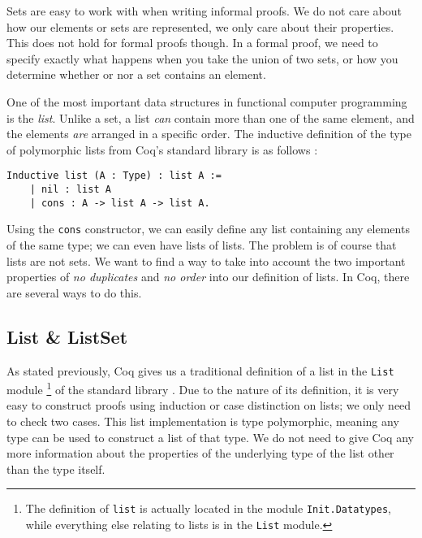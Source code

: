 Sets are easy to work with when writing informal proofs.
We do not care about how our elements or sets are represented, we only care about their properties.
This does not hold for formal proofs though. In a formal proof, we need to specify exactly what happens
when you take the union of two sets, or how you determine whether or nor a set contains an element.

One of the most important data structures in functional computer programming is the \emph{list}.
Unlike a set, a list \emph{can} contain more than one of the same element, and the elements \emph{are} arranged in a
specific order.
The inductive definition of the type of polymorphic lists from Coq's standard library is as follows \cite{coqdatatypes}:

\begin{minipage}{\linewidth}
\begin{lstlisting}[language=Coq, label={lst:list_def}, caption={Inductive definition of the list type in Coq}]
Inductive list (A : Type) : list A :=
    | nil : list A
    | cons : A -> list A -> list A.
\end{lstlisting}
\end{minipage}

Using the \lstinline{cons} constructor, we can easily define any list containing any elements of the same type;
we can even have lists of lists.
The problem is of course that lists are not sets. We want to find a way to take into account the two important properties
of \emph{no duplicates} and \emph{no order} into our definition of lists.
In Coq, there are several ways to do this.

\subsection{List \& ListSet}
\label{ssec:list_listset}

As stated previously, Coq gives us a traditional definition of a list in the \lstinline{List} module
\footnote{The definition of \lstinline{list} is actually located in the module \lstinline{Init.Datatypes},
while everything else relating to lists is in the \lstinline{List} module.} of the standard library \cite{coqlist}.
Due to the nature of its definition, it is very easy to construct proofs using induction or case distinction on lists;
we only need to check two cases.
This list implementation is type polymorphic, meaning any type can be used to construct a list of that type.
We do not need to give Coq any more information about the properties of the underlying type of the list other than the type itself.

